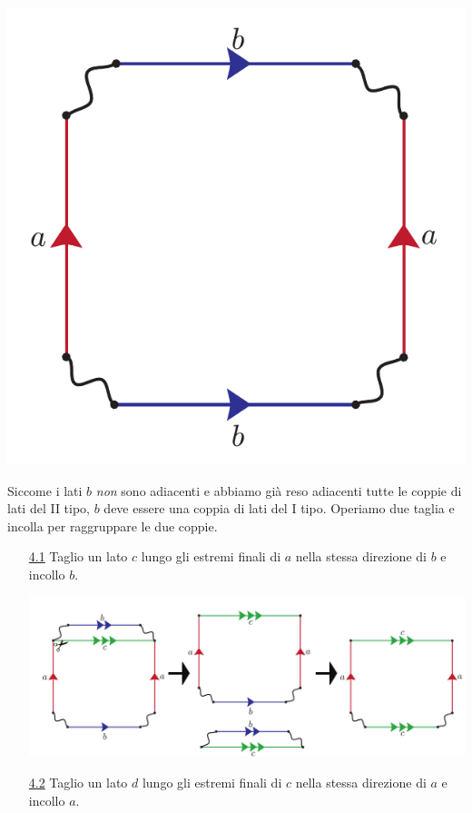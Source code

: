 \begin{demonstration}
\begin{center}
	\includegraphics[trim=0cm 0cm 0cm 0cm, clip, scale=0.35]{images/cutandpastealgorithmstep4-2.pdf}
\end{center}
Siccome i lati $b$ \textit{non} sono adiacenti e abbiamo già reso adiacenti tutte le coppie di lati del II tipo, $b$ deve essere una coppia di lati del I tipo.
Operiamo due taglia e incolla per raggruppare le due coppie.
\begin{enumerate}
	\item[\underline{4.1}] Taglio un lato $c$ lungo gli estremi finali di $a$ nella stessa direzione di $b$ e incollo $b$.
	\begin{center}
		\includegraphics[trim=0cm 0cm 0cm 0cm, clip, scale=0.35]{images/cutandpastealgorithmstep4-3.pdf}
	\end{center}
	\item[\underline{4.2}] Taglio un lato $d$ lungo gli estremi finali di $c$ nella stessa direzione di $a$ e incollo $a$.

\end{enumerate}
\end{demonstration}
